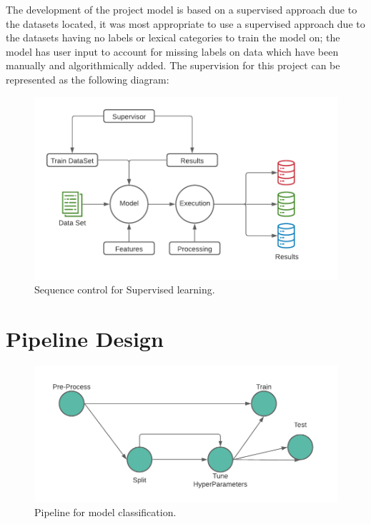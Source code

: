 The development of the project model is based on a supervised approach due to the datasets located, it was most appropriate to use a supervised approach due to the datasets having no labels or lexical categories to train the model on; the model has user input to account for missing labels on data which have been manually and algorithmically added. The supervision for this project can be represented as the following diagram:

\begin{figure}[H]
    \centering
    \includegraphics[width=\textwidth]{figures/chapter-5/SupervisedLearningChart.pdf}
    \caption[SupervisedLearning]{Sequence control for Supervised learning.
    \label{fig:SupervisedLearningChart}}
\end{figure}

\section{Pipeline Design}

\begin{figure}[H]
    \centering
    \includegraphics[width=\textwidth]{figures/chapter-5/Pipeline.pdf}
    \caption[MLTCPipeline]{Pipeline for model classification.
    \label{fig:MLTCPipeline}}
\end{figure}

